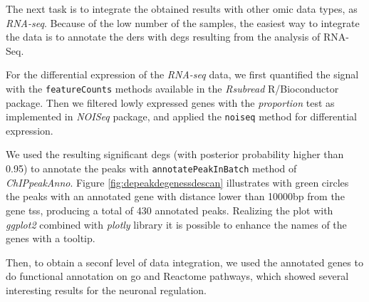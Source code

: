 The next task is to integrate the obtained results with other omic data types, as \textit{RNA-seq}. 
Because of the low number of the samples, the easiest way to integrate the data is to annotate the \glspl{der} with \glspl{deg} resulting from the analysis of RNA-Seq.

For the differential expression of the \textit{RNA-seq} data, we first quantified the signal with the \lstinline!featureCounts! methods available in the \textit{Rsubread} \cite{Liao2013} R/Bioconductor package.
Then we filtered lowly expressed genes with the \textit{proportion} test as implemented in \textit{NOISeq} package, and applied the \lstinline!noiseq! method for differential expression.

We used the resulting significant \glspl{deg} (with posterior probability higher than 0.95) to annotate the peaks with \lstinline!annotatePeakInBatch! method of \textit{ChIPpeakAnno}.
Figure 	\ref{fig:depeakdegenessdescan} illustrates with green circles the peaks with an annotated gene with distance lower than 10000bp from the gene \gls{tss}, producing a total of 430 annotated peaks.
Realizing the plot with \textit{ggplot2} combined with \textit{plotly} library it is possible to enhance the names of the genes with a tooltip.

Then, to obtain a seconf level of data integration, we used the annotated genes to do functional annotation on \gls{go} \cite{GeneOntologyConsortium2004, GeneOntologyConsortium2015} and Reactome pathways, which showed several interesting results for the neuronal regulation.








